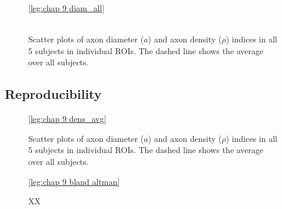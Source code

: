 \begin{figure}[ht]
	\centering
	\ref{leg:chap 9 diam_all}
	\\	
	\\
	\caption{Scatter plots of axon diameter ($a$) and axon density ($\rho$) indices in all 5 subjects in individual ROIs. The dashed line shows the average over all subjects.}
	\label{fig:chap9 scan rescan scatterplots per subject}
\end{figure}

\subsection*{Reproducibility}
\begin{figure}[ht]
	\centering
	\ref{leg:chap 9 dens_avg}\\	
	\caption{Scatter plots of axon diameter ($a$) and axon density ($\rho$) indices in all 5 subjects in individual ROIs. The dashed line shows the average over all subjects.}
	\label{fig:chap9 scan rescan scatterplots per subject}
\end{figure}

\begin{figure}[ht]
	\centering
	\ref{leg:chap 9 bland altman}	
	\caption{XX}
	\label{fig:chap9 bland altman plot}	
\end{figure}	




